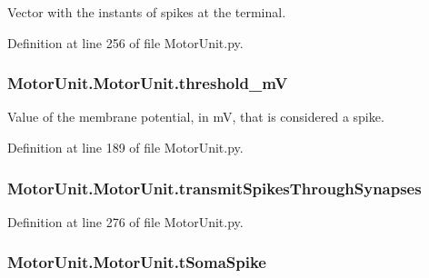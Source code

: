 Vector with the instants of spikes at the terminal. 



Definition at line 256 of file Motor\+Unit.\+py.

\subsubsection[{\texorpdfstring{threshold\+\_\+mV}{threshold_mV}}]{\setlength{\rightskip}{0pt plus 5cm}Motor\+Unit.\+Motor\+Unit.\+threshold\+\_\+mV}\hypertarget{class_motor_unit_1_1_motor_unit_affbd0b90f1dce6a0f929775e54f8c212}{}\label{class_motor_unit_1_1_motor_unit_affbd0b90f1dce6a0f929775e54f8c212}


Value of the membrane potential, in mV, that is considered a spike. 



Definition at line 189 of file Motor\+Unit.\+py.

\subsubsection[{\texorpdfstring{transmit\+Spikes\+Through\+Synapses}{transmitSpikesThroughSynapses}}]{\setlength{\rightskip}{0pt plus 5cm}Motor\+Unit.\+Motor\+Unit.\+transmit\+Spikes\+Through\+Synapses}\hypertarget{class_motor_unit_1_1_motor_unit_a30fc94e8b9f24b75770bb903e20f1961}{}\label{class_motor_unit_1_1_motor_unit_a30fc94e8b9f24b75770bb903e20f1961}


Definition at line 276 of file Motor\+Unit.\+py.

\subsubsection[{\texorpdfstring{t\+Soma\+Spike}{tSomaSpike}}]{\setlength{\rightskip}{0pt plus 5cm}Motor\+Unit.\+Motor\+Unit.\+t\+Soma\+Spike}\hypertarget{class_motor_unit_1_1_motor_unit_abca82ec2c7312bb475989bb45e82ca28}{}\label{class_motor_unit_1_1_motor_unit_abca82ec2c7312bb475989bb45e82ca28}


